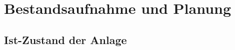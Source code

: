 
\section{Bestandsaufnahme und Planung}

\subsection{Ist-Zustand der Anlage}
\label{txt:istzustandanlage}

